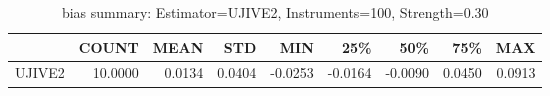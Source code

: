 \begin{table}[ht]
\centering
\caption{bias summary: Estimator=UJIVE2, Instruments=100, Strength=0.30}
\begin{tabular}{lrrrrrrrr}
\toprule
 & COUNT & MEAN & STD & MIN & 25\% & 50\% & 75\% & MAX \\
\midrule
UJIVE2 & 10.0000 & 0.0134 & 0.0404 & -0.0253 & -0.0164 & -0.0090 & 0.0450 & 0.0913 \\
\bottomrule
\end{tabular}
\end{table}

